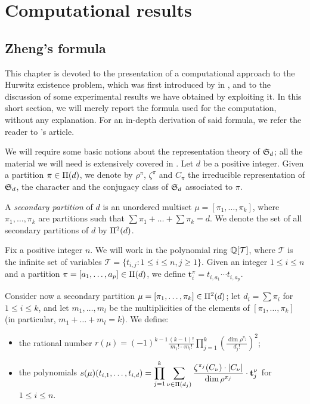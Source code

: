 \chapter{Computational results}\label{computational-results:ch}

\section{Zheng's formula}
\bgroup
\def\tt{\mathbf{t}}

This chapter is devoted to the presentation of a computational approach to the Hurwitz existence problem, which was first introduced by \citeauthor{zheng} in \cite{zheng}, and to the discussion of some experimental results we have obtained by exploiting it. In this short section, we will merely report the formula used for the computation, without any explanation. For an in-depth derivation of said formula, we refer the reader to \citeauthor{zheng}'s article.

We will require some basic notions about the representation theory of $\symgroup[d]$; all the material we will need is extensively covered in \cite{sagan}. Let $d$ be a positive integer. Given a partition $\pi\in\Pi(d)$, we denote by $\rho^\pi$, $\zeta^\pi$ and $C_\pi$ the irreducible representation of $\symgroup[d]$, the character and the conjugacy class of $\symgroup[d]$ associated to $\pi$.

A \emph{secondary partition} of $d$ is an unordered multiset $\mu=[\pi_1,\ldots,\pi_k]$, where $\pi_1,\ldots,\pi_k$ are partitions such that $\sum\pi_1+\ldots+\sum\pi_k=d$. We denote the set of all secondary partitions of $d$ by $\Pi^2(d)$.

Fix a positive integer $n$. We will work in the polynomial ring $\mathbb{Q}[\mathcal{T}]$, where $\mathcal{T}$ is the infinite set of variables $\mathcal{T}=\{t_{i,j}\colon 1\le i\le n,j\ge 1\}$. Given an integer $1\le i\le n$ and a partition $\pi=[a_1,\ldots,a_p]\in\Pi(d)$, we define $\tt_i^\pi=t_{i,a_1}\cdots t_{i,a_p}$.

Consider now a secondary partition $\mu=[\pi_1,\ldots,\pi_k]\in\Pi^2(d)$; let $d_i=\sum\pi_i$ for $1\le i\le k$, and let $m_1,\ldots,m_l$ be the multiplicities of the elements of $[\pi_1,\ldots,\pi_k]$ (in particular, $m_1+\ldots+m_l=k$). We define:
\begin{itemize}
\item the rational number $\displaystyle r(\mu)=(-1)^{k-1}\frac{(k-1)!}{m_1!\cdots m_l!}\prod_{j=1}^k\left(\frac{\dim\rho^{\pi_j}}{d_j!}\right)^2$;
\item the polynomials $\displaystyle s(\mu)(t_{i,1},\ldots,t_{i,d})=\prod_{j=1}^k\sum_{\nu\in\Partitions{d_j}}\frac{\zeta^{\pi_j}(C_\nu)\cdot\card{C_\nu}}{\dim\rho^{\pi_j}}\cdot\tt_j^\nu$ for $1\le i\le n$.
\end{itemize}

